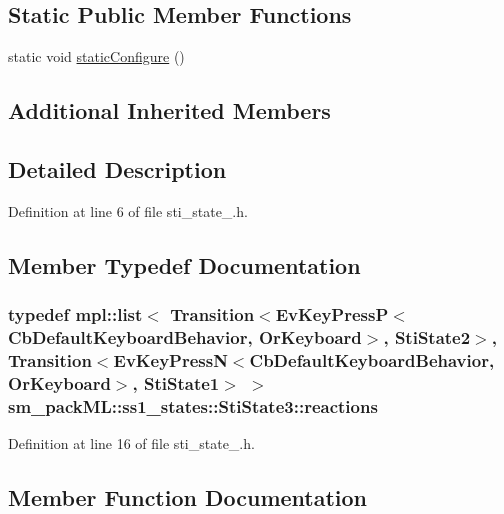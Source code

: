 \subsection*{Static Public Member Functions}
\begin{DoxyCompactItemize}
\item 
static void \hyperlink{structsm__packML_1_1ss1__states_1_1StiState3_a83a29091d50ed6d87bf30ca4dac598df}{static\+Configure} ()
\end{DoxyCompactItemize}
\subsection*{Additional Inherited Members}


\subsection{Detailed Description}


Definition at line 6 of file sti\+\_\+state\+\_.\+h.



\subsection{Member Typedef Documentation}
\subsubsection[{\texorpdfstring{reactions}{reactions}}]{\setlength{\rightskip}{0pt plus 5cm}typedef mpl\+::list$<$ Transition$<$Ev\+Key\+PressP$<$Cb\+Default\+Keyboard\+Behavior, {\bf Or\+Keyboard}$>$, {\bf Sti\+State2}$>$, Transition$<$Ev\+Key\+PressN$<$Cb\+Default\+Keyboard\+Behavior, {\bf Or\+Keyboard}$>$, {\bf Sti\+State1}$>$ $>$ {\bf sm\+\_\+pack\+M\+L\+::ss1\+\_\+states\+::\+Sti\+State3\+::reactions}}\hypertarget{structsm__packML_1_1ss1__states_1_1StiState3_ac2f467f9a95a2ef7f913ac8ec703651f}{}\label{structsm__packML_1_1ss1__states_1_1StiState3_ac2f467f9a95a2ef7f913ac8ec703651f}


Definition at line 16 of file sti\+\_\+state\+\_.\+h.



\subsection{Member Function Documentation}
